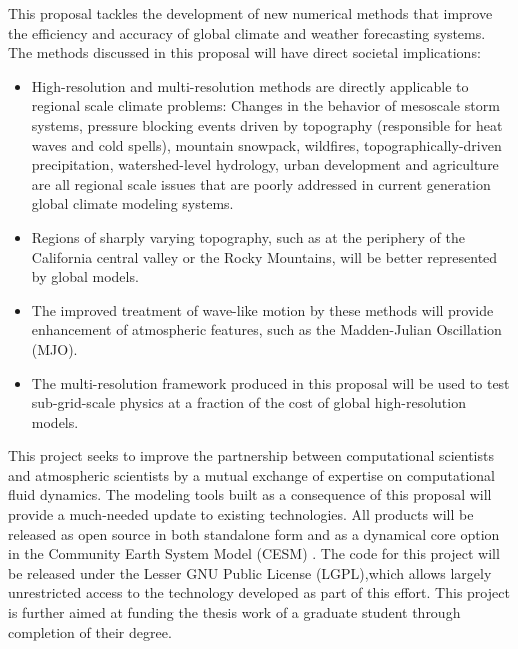 \documentclass[11pt]{article}
\begin{document}
This proposal tackles the development of new numerical methods that improve the efficiency and accuracy of global climate and weather forecasting systems.  The methods discussed in this proposal will have direct societal implications:
\vspace{-0.4cm}
\begin{itemize}
\item High-resolution and multi-resolution methods are directly applicable to regional scale climate problems: Changes in the behavior of mesoscale storm systems, pressure blocking events driven by topography (responsible for heat waves and cold spells), mountain snowpack, wildfires, topographically-driven precipitation, watershed-level hydrology, urban development and agriculture are all regional scale issues that are poorly addressed in current generation global climate modeling systems.
\item Regions of sharply varying topography, such as at the periphery of the California central valley or the Rocky Mountains, will be better represented by global models.
\item The improved treatment of wave-like motion by these methods will provide enhancement of atmospheric features, such as the Madden-Julian Oscillation (MJO).
\item The multi-resolution framework produced in this proposal will be used to test sub-grid-scale physics at a fraction of the cost of global high-resolution models.
\end{itemize}
\vspace{-0.4cm}
This project seeks to improve the partnership between computational scientists and atmospheric scientists by a mutual exchange of expertise on computational fluid dynamics.  The modeling tools built as a consequence of this proposal will provide a much-needed update to existing technologies.  All products will be released as open source in both standalone form and as a dynamical core option in the Community Earth System Model (CESM) \cite{JWHetal2013BAMS}.  The code for this project will be released under the Lesser GNU Public License (LGPL),which allows largely unrestricted access to the technology developed as part of this effort.  This project is further aimed at funding the thesis work of a graduate student through completion of their degree.
\end{document}
